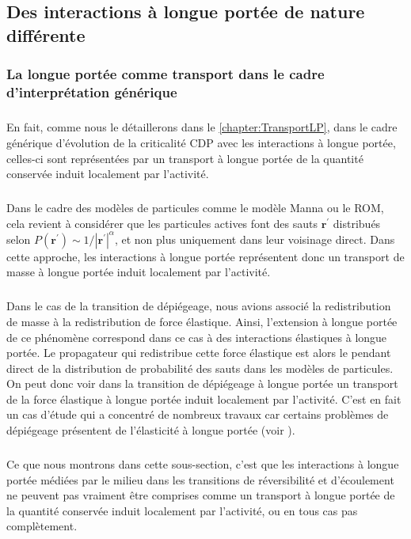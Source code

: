 \subsection{Des interactions à longue portée de nature différente}

\subsubsection{La longue portée comme transport dans le cadre d'interprétation générique}

\subparagraph{}En fait, comme nous le détaillerons dans le \autoref{chapter:TransportLP}, dans le cadre générique d'évolution de la criticalité CDP avec les interactions à longue portée, celles-ci sont représentées par un transport à longue portée de la quantité conservée induit localement par l'activité.

\subparagraph{}Dans le cadre des modèles de particules comme le modèle Manna ou le ROM, cela revient à considérer que les particules actives font des sauts $\mathbf{r}^\prime$ distribués selon $P(\mathbf{r}^\prime)\sim 1/|\mathbf{r}^{\prime}|^{\alpha}$, et non plus uniquement dans leur voisinage direct. Dans cette approche, les interactions à longue portée représentent donc un transport de masse à longue portée induit localement par l'activité.

\subparagraph{}Dans le cas de la transition de dépiégeage, nous avions associé la redistribution de masse à la redistribution de force élastique. Ainsi, l'extension à longue portée de ce phénomène correspond dans ce cas à des interactions élastiques à longue portée. Le propagateur qui redistribue cette force élastique est alors le pendant direct de la distribution de probabilité des sauts dans les modèles de particules. On peut donc voir dans la transition de dépiégeage à longue portée un transport de la force élastique à longue portée induit localement par l'activité. C'est en fait un cas d'étude qui a concentré de nombreux travaux car certains problèmes de dépiégeage présentent de l'élasticité à longue portée (voir ).


\subparagraph{}Ce que nous montrons dans cette sous-section, c'est que les interactions à longue portée médiées par le milieu dans les transitions de réversibilité et d'écoulement ne peuvent pas vraiment être comprises comme un transport à longue portée de la quantité conservée induit localement par l'activité, ou en tous cas pas complètement.

